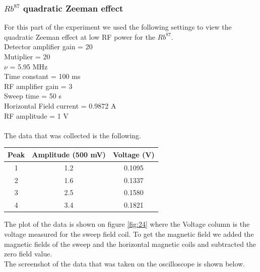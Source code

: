 \documentclass[twocolumn]{article}
\begin{document}
\subsubsection{$Rb^{87}$ quadratic Zeeman effect}
For this part of the experiment we used the following settings to view the 
quadratic Zeeman effect at low RF power for the $Rb^{87}$.
\\
Detector amplifier gain = 20 \\
Mutiplier = 20 \\
$\nu$ = 5.95 MHz \\
Time constant = 100 ms \\
RF amplifier gain = 3 \\
Sweep time = 50 s \\
Horizontal Field current = 0.9872 A \\
RF amplitude = 1 V \\
\\
The data that was collected is the following.
\begin{minipage}{\linewidth}
\center
\begin{tabular}{|c|c|c|}
\hline
Peak & Amplitude (500 mV) & Voltage (V) \\ \hline
1 & 1.2 & 0.1095 \\ \hline
2 & 1.6 & 0.1337 \\ \hline
3 & 2.5 & 0.1580 \\ \hline
4 & 3.4 & 0.1821 \\ \hline
\end{tabular}
\label{tbl:8}
\end{minipage}
The plot of the data is shown on figure \ref{fig:24} where the Voltage column 
is the voltage measured for the sweep field coil. To get the magnetic field we 
added the magnetic fields of the sweep and the horizontal magnetic coils and 
subtracted the zero field value.
\\
The screenshot of the data that was taken on the oscilloscope is shown below.
\center
\end{document}
